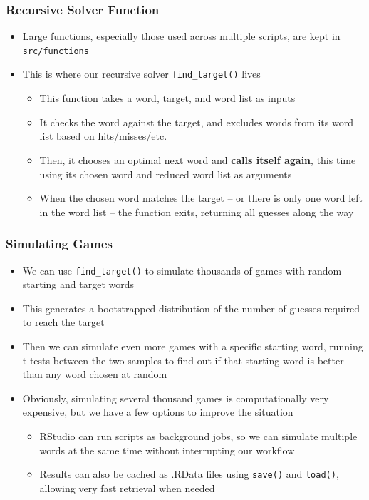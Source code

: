 \documentclass[
]{article}
\begin{document}
\hypertarget{recursive-solver-function}{%
\subsubsection{Recursive Solver
Function}\label{recursive-solver-function}}

\begin{itemize}
\item
  Large functions, especially those used across multiple scripts, are
  kept in \texttt{src/functions}
\item
  This is where our recursive solver \texttt{find\_target()} lives

  \begin{itemize}
  \item
    This function takes a word, target, and word list as inputs
  \item
    It checks the word against the target, and excludes words from its
    word list based on hits/misses/etc.
  \item
    Then, it chooses an optimal next word and \textbf{calls itself
    again}, this time using its chosen word and reduced word list as
    arguments
  \item
    When the chosen word matches the target -- or there is only one word
    left in the word list -- the function exits, returning all guesses
    along the way
  \end{itemize}
\end{itemize}

\hypertarget{simulating-games}{%
\subsubsection{Simulating Games}\label{simulating-games}}

\begin{itemize}
\item
  We can use \texttt{find\_target()} to simulate thousands of games with
  random starting and target words
\item
  This generates a bootstrapped distribution of the number of guesses
  required to reach the target
\item
  Then we can simulate even more games with a specific starting word,
  running t-tests between the two samples to find out if that starting
  word is better than any word chosen at random
\item
  Obviously, simulating several thousand games is computationally very
  expensive, but we have a few options to improve the situation

  \begin{itemize}
  \item
    RStudio can run scripts as background jobs, so we can simulate
    multiple words at the same time without interrupting our workflow
  \item
    Results can also be cached as .RData files using \texttt{save()} and
    \texttt{load()}, allowing very fast retrieval when needed
  \end{itemize}
\end{itemize}
\end{document}
